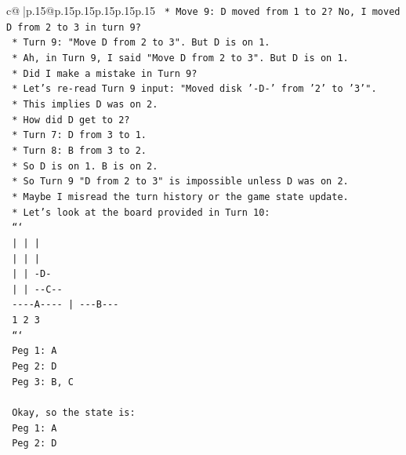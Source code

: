 \documentclass{article}
\begin{document}
{\begin{supertabular}{c@{$\;$}|p{.15\linewidth}@{}p{.15\linewidth}p{.15\linewidth}p{.15\linewidth}p{.15\linewidth}p{.15\linewidth}}
{{{\texttt{    *   Move 9: D moved from 1 to 2? No, I moved D from 2 to 3 in turn 9?} \\
\texttt{        *   Turn 9: "Move D from 2 to 3". But D is on 1.} \\
\texttt{        *   Ah, in Turn 9, I said "Move D from 2 to 3". But D is on 1.} \\
\texttt{        *   Did I make a mistake in Turn 9?} \\
\texttt{        *   Let's re{-}read Turn 9 input: "Moved disk '{-}D{-}' from '2' to '3'".} \\
\texttt{        *   This implies D was on 2.} \\
\texttt{        *   How did D get to 2?} \\
\texttt{        *   Turn 7: D from 3 to 1.} \\
\texttt{        *   Turn 8: B from 3 to 2.} \\
\texttt{        *   So D is on 1. B is on 2.} \\
\texttt{        *   So Turn 9 "D from 2 to 3" is impossible unless D was on 2.} \\
\texttt{        *   Maybe I misread the turn history or the game state update.} \\
\texttt{        *   Let's look at the board provided in Turn 10:} \\
\texttt{            ```} \\
\texttt{                |         |         |    } \\
\texttt{                |         |         |    } \\
\texttt{                |         |        {-}D{-}   } \\
\texttt{                |         |       {-}{-}C{-}{-}  } \\
\texttt{            {-}{-}{-}{-}A{-}{-}{-}{-}     |      {-}{-}{-}B{-}{-}{-} } \\
\texttt{                1         2         3    } \\
\texttt{            ```} \\
\texttt{            Peg 1: A} \\
\texttt{            Peg 2: D} \\
\texttt{            Peg 3: B, C} \\
\\ 
\texttt{            Okay, so the state is:} \\
\texttt{            Peg 1: A} \\
\texttt{            Peg 2: D} \\
}}}
\end{supertabular}}
\end{document}
